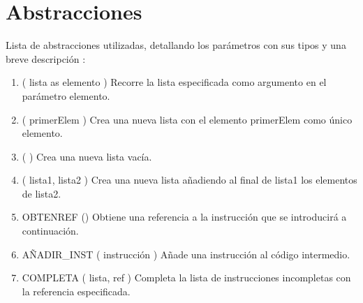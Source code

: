 
\chapter{Abstracciones}

Lista de abstracciones utilizadas, detallando los parámetros con sus tipos y una breve 
descripción :

\begin{enumerate}
	\item {} ( lista as elemento ) 
			Recorre la lista especificada como argumento en el parámetro elemento. \\
	\item {} ( primerElem ) 
			Crea una nueva lista con el elemento primerElem como único elemento. \\
			
	\item {} ( ) 
			Crea una nueva lista vacía. \\
			
	\item {} ( lista1, lista2 ) 
			Crea una nueva lista añadiendo al final de lista1 los elementos de lista2. \\
			
	\item OBTENREF () 
			Obtiene una referencia a la instrucción que se introducirá a continuación. \\
			
	\item AÑADIR\_INST ( instrucción ) 
			Añade una instrucción al código intermedio. \\

	\item COMPLETA ( lista, ref ) 
			Completa la lista de instrucciones incompletas con la referencia especificada. \\
			
\end{enumerate}